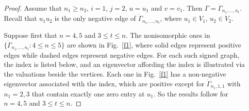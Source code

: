 \documentclass[12pt]{article}
\numberwithin{equation}{section}
\begin{document}
\begin{proof} Assume that $n_1\ge n_2$, $i=1$,  $j=2$,  $u=u_1$  and $v=v_1$. Then 
$\Gamma=\dot\Gamma_{n_1, \dots, n_t}$. Recall that $u_1u_2$ is the only negative edge of $\dot\Gamma_{n_1, \dots, n_t}$, where  $u_1\in V_1$, $u_2\in V_2$. 

Suppose first that $n=4, 5$ and $3\le t\le n$. The nonisomorphic ones in $\{\dot\Gamma_{n_1, \dots, n_t}: 4\le n\le 5\}$ are shown in Fig.~\ref{f1}, where solid edges represent positive edges while dashed edges represent negative edges. For each such signed graph, the index is listed below, and an eigenvector affording the index is illustrated via the valuations beside the vertices.
Each one in  Fig.~\ref{f1} has a non-negative eigenvector associated with the index, which are positive except for $\dot\Gamma_{n_1, 1, 1}$ with $n_1=2,3$ that contain exactly one zero entry at $u_1$. So the results follow for $n=4, 5$ and $3\le t\le n$. 





\end{proof}
\end{document}
